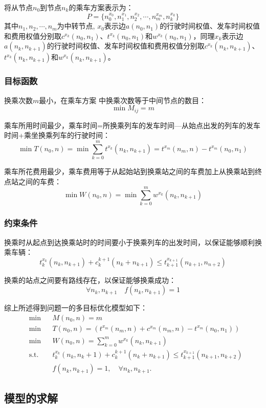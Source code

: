 \documentclass[nocover]{cumcmart}%
\begin{document}
 将从节点$n_0$到节点$n_k$的乘车方案表示为：
  \[P = \{n_0^{x_0}, n_1^{x_1}, n_2^{x_2}, \cdots,n_m^{x_m},n_k^{x_k}\}\]
 其中$n_1,n_2,\cdots,n_m$为中转节点, $x_0$表示边$a(n_0,n_1)$的行驶时间权值、发车时间权值和费用权值分别取$c^{x_k}(n_0,n_1)$、$t^{x_k}(n_0,n_1)$和$w^{x_k}(n_0,n_1)$，同理$x_k$表示边$a(n_k,n_{k+1})$的行驶时间权值、发车时间权值和费用权值分别取$c^{x_k}(n_k,n_{k+1})$、$t^{x_k}(n_k,n_{k+1})$和$w^{x_k}(n_k,n_{k+1})$。
 
 \subsubsection{目标函数}
 换乘次数$m$最小，在乘车方案 中换乘次数等于中间节点的数目：
 \[\min M_{ij} = m\]
 
乘车所用时间最少，乘车时间=所换乘列车的发车时间—从始点出发的列车的发车时间+乘坐换乘列车的行驶时间：
\[\min T(n_0,n) = \min \sum_{ k=0}^{m} t^{x_k}(n_k,n_{k+1})  = t^{x_m}(n_m,n)-t^{x_m}(n_0,n_1)\]

乘车所花费用最少，乘车费用等于从起始站到换乘站之间的车费加上从换乘站到终点站之间的车费：
\[\min W(n_0,n) = \min \sum_{k=0}^{m} w^{x_k} (n_k,n_{k+1})\]


\subsubsection{约束条件}
换乘时从起点到达换乘站时的时间要小于换乘列车的出发时间，以保证能够顺利换乘车辆：
\[
t^{x_k}_k(n_k,n_{k+1}) + c^{k+1}_k (n_k+n_{k+1}) \leq t^{x_{k+1}}_{k+1}(n_{k+1},n_{n+2})
\]

换乘的站点之间要有路线存在，以保证能够换乘成功：
\[
\forall n_k, n_{k+1} \quad f(n_k,n_{k+1})=1 
\]

综上所述得到问题一的多目标优化模型如下：
\begin{equation*}
\begin{aligned}
& \text{min} & & M(n_0,n) = m \\
& \text{min} & & T(n_0,n) = (t^{x_m}(n_m,n) + c^{x_m}(n_m,n) - t^{x_m}(n_0,n_1)) \\
& \text{min} & & W(n_0,n) = \sum_{k=0}^{m} w^{x_k}(n_k,n_{k+1}) \\
& \text{s.t.} & & t_k^{x_k}(n_k,n_k+1)+c_k^{k+1}(n_k+n_{k+1}) \leq t_{k+1}^{x_{k+1}}(n_{k+1},n_{k+2}) \\
&&& f(n_k,n_{k+1}) =1, \quad \forall n_k,n_{k+1}.
\end{aligned}
\end{equation*}

\subsection{模型的求解}
\end{document}
